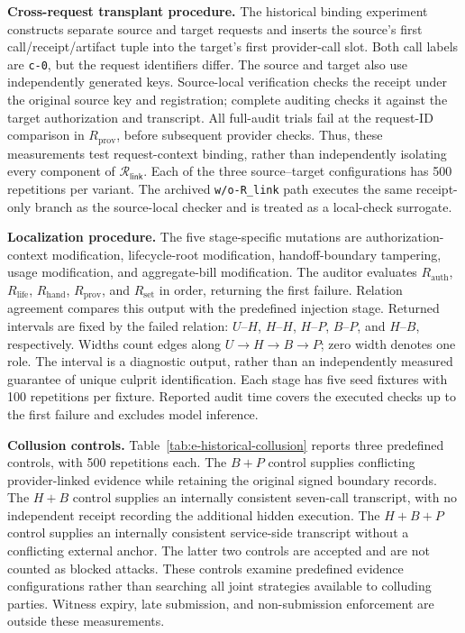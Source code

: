 \noindent\textbf{Cross-request transplant procedure.}
The historical binding experiment constructs separate source and target
requests and inserts the source's first call/receipt/artifact tuple into the
target's first provider-call slot.
Both call labels are \texttt{c-0}, but the request identifiers differ.
The source and target also use independently generated keys.
Source-local verification checks the receipt under the original source key
and registration; complete auditing checks it against the target authorization
and transcript.
All full-audit trials fail at the request-ID comparison in $R_{\mathrm{prov}}$,
before subsequent provider checks.
Thus, these measurements test request-context binding, rather than independently
isolating every component of $\mathcal{R}_{\mathsf{link}}$.
Each of the three source--target configurations has 500 repetitions per variant.
The archived \texttt{w/o-R\_link} path executes the same receipt-only branch as
the source-local checker and is treated as a local-check surrogate.

\noindent\textbf{Localization procedure.}
The five stage-specific mutations are authorization-context modification,
lifecycle-root modification, handoff-boundary tampering, usage modification,
and aggregate-bill modification.
The auditor evaluates $R_{\mathrm{auth}}$, $R_{\mathrm{life}}$,
$R_{\mathrm{hand}}$, $R_{\mathrm{prov}}$, and $R_{\mathrm{set}}$ in order,
returning the first failure.
Relation agreement compares this output with the predefined injection stage.
Returned intervals are fixed by the failed relation:
$U$--$H$, $H$--$H$, $H$--$P$, $B$--$P$, and $H$--$B$, respectively.
Widths count edges along $U\!\rightarrow\!H\!\rightarrow\!B\!\rightarrow\!P$;
zero width denotes one role.
The interval is a diagnostic output, rather than an independently measured
guarantee of unique culprit identification.
Each stage has five seed fixtures with 100 repetitions per fixture.
Reported audit time covers the executed checks up to the first failure and
excludes model inference.

\noindent\textbf{Collusion controls.}
Table~\ref{tab:e-historical-collusion} reports three predefined controls,
with 500 repetitions each.
The $B+P$ control supplies conflicting provider-linked evidence while retaining
the original signed boundary records.
The $H+B$ control supplies an internally consistent seven-call transcript,
with no independent receipt recording the additional hidden execution.
The $H+B+P$ control supplies an internally consistent service-side transcript
without a conflicting external anchor.
The latter two controls are accepted and are not counted as blocked attacks.
These controls examine predefined evidence configurations rather than searching
all joint strategies available to colluding parties.
Witness expiry, late submission, and non-submission enforcement are outside
these measurements.

